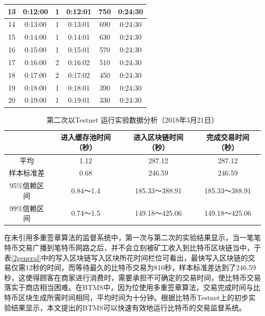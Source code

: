 \begin{enumerate}
\begin{table}[!htbp]
\begin{tabular}{|c|c|c|c|c|c|}
				13 & 0:12:00 & 1 & 0:12:01 & 750 & 0:24:30 \\ \hline
				14 & 0:13:00 & 1 & 0:13:01 & 690 & 0:24:30 \\ \hline
				15 & 0:14:00 & 1 & 0:14:01 & 630 & 0:24:30 \\ \hline
				16 & 0:15:00 & 1 & 0:15:01 & 570 & 0:24:30 \\ \hline
				17 & 0:16:00 & 2 & 0:16:02 & 510 & 0:24:30 \\ \hline
				18 & 0:17:00 & 2 & 0:17:02 & 450 & 0:24:30 \\ \hline
				19 & 0:18:00 & 1 & 0:18:01 & 390 & 0:24:30 \\ \hline
				20 & 0:19:00 & 1 & 0:19:01 & 330 & 0:24:30 \\ \hline
				\end{tabular}
				\end{table}

				\begin{table}[!htbp]
				\centering
				\caption{第二次以Testnet 运行实验数据分析（2018年3月21日）}
				\label{2general-1}
				\begin{tabular}{|c|c|c|c|}
				\hline
				         & 进入缓存池时间（秒） & 进入区块链时间（秒）    & 完成交易时间（秒）     \\ \hline
				平均       & 1.12       & 287.12        & 287.12        \\ \hline
				样本标准差    & 0.68       & 246.59        & 246.59        \\ \hline
				95\%信赖区间 & 0.84～1.4   & 185.33～388.91 & 185.33～388.91 \\ \hline
				99\%信赖区间 & 0.74～1.5   & 149.18～425.06 & 149.18～425.06 \\ \hline
				\end{tabular}
				\end{table}


		\end{enumerate}

			在未引用多重签章算法的监督系统中，第一次与第二次的实验结果显示，当一笔笔特币交易广播到笔特币网路之后，并不会立刻被矿工收入到比特币区块链当中，于表\ref{2general}中的写入区块链写入区块所花时间栏位可看出，最快写入区块链的交易仅需12秒的时间，而等待最久的比特币交易为810秒，样本标准差达到了246.59秒，这使得顾客在商家进行消费时，需要承担不可确定的交易时间，使比特币交易落实于商店相当困难。在BTMS中，因为位使用多重签章算法，交易完成时间与比特币区块生成所需时间相同，平均时间为十分钟。根据比特币Testnet上的初步实验结果显示，本文提出的BTMS可以快速有效地运行比特币的交易监督系统。

